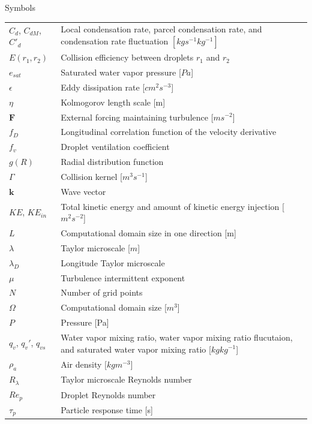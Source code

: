 \documentclass [12pt,letterpaper]{report}
\begin{document}
\noindent \Large Symbols \normalsize
\begin{flushleft}
\begin{longtable}{p{4cm}p{13cm}}
    $C_d$, $C_{dM}$, $C\prime_d$ & Local condensation rate, parcel condensation rate, and condensation rate fluctuation $[kgs^{-1}kg^{-1}]$\\
    $E(r_1,r_2)$ 	& Collision efficiency between droplets $r_1$ and $r_2$\\
    $e_{sat}$            & Saturated water vapor pressure [$Pa$]\\
    $\epsilon$ 		& Eddy dissipation rate [$cm^2 s^{-3}$]\\
    $\eta$ 		& Kolmogorov length scale [m]\\
    $\mathbf{F}$ 	& External forcing maintaining turbulence [$m s^{-2}$]\\
    $f_D$               & Longitudinal correlation function of the velocity derivative\\
    $f_v$               & Droplet ventilation coefficient\\
    $g(R)$ 		& Radial distribution function\\
    $\Gamma$ 		& Collision kernel [$m^3s^{-1}$]\\
    $\mathbf{k}$ 	& Wave vector \\
    $KE$, $KE_{in}$      & Total kinetic energy and amount of kinetic energy injection  [$m^2s^{-2}$]\\
    $L$ 		& Computational domain size in one direction [m]\\
    $\lambda$           & Taylor microscale [$m$]\\
    $\lambda_D$         & Longitude Taylor microscale\\
    $\mu$               & Turbulence intermittent exponent\\
    $N$                 & Number of grid points\\
    $\Omega$ 		& Computational domain size [$m^3$]\\
    $P$ 		& Pressure [Pa]\\
    $q_v$, $q_v\prime$, $q_{vs}$      & Water vapor mixing ratio, water vapor mixing ratio flucutaion, and saturated water vapor mixing ratio [$kgkg^{-1}$] \\
    $\rho_a$		& Air density [$kgm^{-3}$]\\
    $R_\lambda$   	& Taylor microscale Reynolds number\\
    $Re_p$ 		& Droplet Reynolds number\\
    $\tau_p$ 		& Particle response time [s]\\

\end{longtable}
\end{flushleft}
\end{document}
